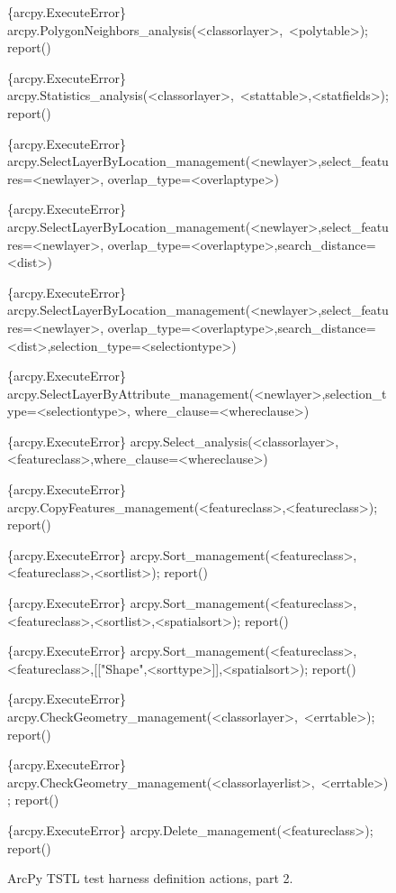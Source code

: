 \begin{figure}
{\begin{code}
\{arcpy.ExecuteError\} arcpy.PolygonNeighbors\_analysis(<classorlayer>,~<polytable>); report()

\{arcpy.ExecuteError\} arcpy.Statistics\_analysis(<classorlayer>,~<stattable>,<statfields>); report()

\{arcpy.ExecuteError\} arcpy.SelectLayerByLocation\_management(<newlayer>,select\_features=<newlayer>,
   overlap\_type=<overlaptype>)

\{arcpy.ExecuteError\} arcpy.SelectLayerByLocation\_management(<newlayer>,select\_features=<newlayer>,
   overlap\_type=<overlaptype>,search\_distance=<dist>)

\{arcpy.ExecuteError\} arcpy.SelectLayerByLocation\_management(<newlayer>,select\_features=<newlayer>,
   overlap\_type=<overlaptype>,search\_distance=<dist>,selection\_type=<selectiontype>)

\{arcpy.ExecuteError\} arcpy.SelectLayerByAttribute\_management(<newlayer>,selection\_type=<selectiontype>,
   where\_clause=<whereclause>)

\{arcpy.ExecuteError\} arcpy.Select\_analysis(<classorlayer>,<featureclass>,where\_clause=<whereclause>)

\{arcpy.ExecuteError\} arcpy.CopyFeatures\_management(<featureclass>,<featureclass>); report()

\{arcpy.ExecuteError\} arcpy.Sort\_management(<featureclass>,<featureclass>,<sortlist>); report()

\{arcpy.ExecuteError\} arcpy.Sort\_management(<featureclass>,<featureclass>,<sortlist>,<spatialsort>); report()

\{arcpy.ExecuteError\} arcpy.Sort\_management(<featureclass>,<featureclass>,[["Shape",<sorttype>]],<spatialsort>); report()

\{arcpy.ExecuteError\} arcpy.CheckGeometry\_management(<classorlayer>,~<errtable>); report()

\{arcpy.ExecuteError\} arcpy.CheckGeometry\_management(<classorlayerlist>,~<errtable>); report()

\{arcpy.ExecuteError\} arcpy.Delete\_management(<featureclass>); report()
\end{code}
}
\caption{ArcPy TSTL test harness definition actions, part 2.}
\label{actions2}
\end{figure}